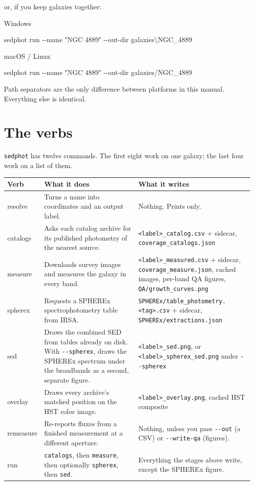 \documentclass[11pt]{article}
\newcommand{\cmdline}[1]{\begin{cmd}\ttfamily #1\end{cmd}}
\begin{document}
or, if you keep galaxies together:

Windows

\cmdline{sedphot run -{}-name "NGC 4889" -{}-out-dir galaxies\textbackslash NGC\_4889}

macOS / Linux

\cmdline{sedphot run -{}-name "NGC 4889" -{}-out-dir galaxies/NGC\_4889}

Path separators are the only difference between platforms in this manual.
Everything else is identical.

\section{The verbs}
\label{sec:verbs}

\texttt{sedphot} has twelve commands. The first eight work on one galaxy;
the last four work on a list of them.

\begin{longtable}{T{2.2cm} L{4.6cm} L{7.2cm}}
\toprule
\textbf{\normalfont Verb} & \textbf{What it does} & \textbf{What it writes} \\
\midrule
\endhead
resolve & Turns a name into coordinates and an output label. &
  Nothing. Prints only. \\[2pt]
catalogs & Asks each catalog archive for its published photometry of the
  nearest source. & \texttt{<label>\_catalog.csv} + sidecar,
  \texttt{coverage\_catalogs.json} \\[2pt]
measure & Downloads survey images and measures the galaxy in every band.
  & \texttt{<label>\_measured.csv} + sidecar,
  \texttt{coverage\_measure.json}, cached images, per-band QA figures,
  \texttt{QA/growth\_curves.png} \\[2pt]
spherex & Requests a SPHEREx spectrophotometry table from IRSA. &
  \texttt{SPHEREx/table\_photometry.<tag>.csv} + sidecar,
  \texttt{SPHEREx/extractions.json} \\[2pt]
sed & Draws the combined SED from tables already on disk. With
  \texttt{-{}-spherex}, draws the SPHEREx spectrum under the broadbands
  as a second, separate figure. &
  \texttt{<label>\_sed.png}, or \texttt{<label>\_spherex\_sed.png} under
  \texttt{-{}-spherex} \\[2pt]
overlay & Draws every archive's matched position on the HST color image.
  & \texttt{<label>\_overlay.png}, cached HST composite \\[2pt]
remeasure & Re-reports fluxes from a finished measurement at a different
  aperture. & Nothing, unless you pass \texttt{-{}-out} (a CSV) or
  \texttt{-{}-write-qa} (figures). \\[2pt]
run & \texttt{catalogs}, then \texttt{measure}, then optionally
  \texttt{spherex}, then \texttt{sed}. & Everything the stages above
  write, except the SPHEREx figure. \\
\bottomrule
\end{longtable}
\end{document}

